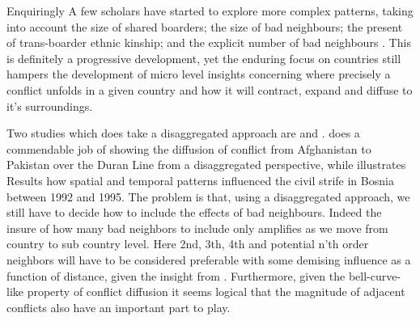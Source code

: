 \documentclass[a4paper]{article}
\begin{document}
Enquiringly A few scholars have started to explore more complex patterns, taking into account the size of shared boarders; the size of bad neighbours; the present of trans-boarder ethnic kinship; and the explicit number of bad neighbours \citep{buhaug2008contagion, Cederman_Gleditsch_Buhaug_2013, bara_2017}. This is definitely a progressive development, yet the enduring focus on countries still hampers the development of micro level insights concerning where precisely a conflict unfolds in a given country and how it will contract, expand and diffuse to it's surroundings.\par



Two studies which does take a disaggregated approach are \cite{ol2010afghanistan} and \cite{weidmann_ward_2010predicting}. \cite{ol2010afghanistan} does a commendable job of showing the diffusion of conflict from Afghanistan to Pakistan over the Duran Line from a disaggregated perspective, while \cite{weidmann_ward_2010predicting} illustrates Results how spatial and temporal patterns influenced the civil strife in Bosnia between 1992 and 1995. The problem is that, using a disaggregated approach, we still have to decide how to include the effects of bad neighbours. Indeed the insure of how many bad neighbors to include only amplifies as we move from country to sub country level. Here 2nd, 3th, 4th and potential n'th order neighbors will have to be considered preferable with some demising influence as a function of distance, given the insight from \cite{schutte2011diffusion}. Furthermore, given the bell-curve-like property of conflict diffusion it seems logical that the magnitude of adjacent conflicts also have an important part to play.\par
\end{document}
